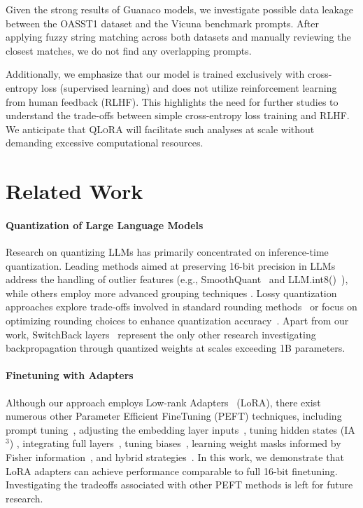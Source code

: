 Given the strong results of {Guanaco} models, we investigate possible data leakage between the OASST1 dataset and the Vicuna benchmark prompts. After applying fuzzy string matching across both datasets and manually reviewing the closest matches, we do not find any overlapping prompts.

Additionally, we emphasize that our model is trained exclusively with cross-entropy loss (supervised learning) and does not utilize reinforcement learning from human feedback (RLHF). This highlights the need for further studies to understand the trade-offs between simple cross-entropy loss training and RLHF. We anticipate that \textsc{QLoRA} will facilitate such analyses at scale without demanding excessive computational resources.

\section{Related Work}

\paragraph{Quantization of Large Language Models} Research on quantizing LLMs has primarily concentrated on inference-time quantization. Leading methods aimed at preserving 16-bit precision in LLMs address the handling of outlier features (e.g., SmoothQuant~\citep{xiao2022smoothquant} and LLM.int8()~\citep{dettmers2022llm}), while others employ more advanced grouping techniques \citep{park2022nuqmm, yao2022zeroquant}. Lossy quantization approaches explore trade-offs involved in standard rounding methods~\citep{dettmers2022case,zeng2022glm,pope2022efficiently} or focus on optimizing rounding choices to enhance quantization accuracy~\citep{frantar2022gptq}. Apart from our work, SwitchBack layers~\citep{wortsman2023stable} represent the only other research investigating backpropagation through quantized weights at scales exceeding 1B parameters.

\paragraph{Finetuning with Adapters} Although our approach employs Low-rank Adapters~\citep{hu2021lora} (LoRA), there exist numerous other Parameter Efficient FineTuning (PEFT) techniques, including prompt tuning~\citep{qin2021learning,lester2021power,li2021prefix}, adjusting the embedding layer inputs~\citep{an2022input}, tuning hidden states (IA$^3$) \citep{liu2022few}, integrating full layers~\citep{houlsby2019parameter}, tuning biases~\citep{zaken2021bitfit}, learning weight masks informed by Fisher information~\citep{sung2021training}, and hybrid strategies~\citep{henderson2021compacter}. In this work, we demonstrate that LoRA adapters can achieve performance comparable to full 16-bit finetuning. Investigating the tradeoffs associated with other PEFT methods is left for future research.

